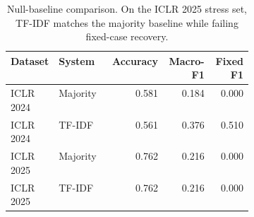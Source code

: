 \begin{table}[t]
\centering
\scriptsize
\setlength{\tabcolsep}{3pt}
\begin{tabular}{p{0.18\linewidth}p{0.22\linewidth}rrr}
\toprule
Dataset & System & Accuracy & Macro-F1 & Fixed F1 \\
\midrule
ICLR 2024 & Majority & 0.581 & 0.184 & 0.000 \\
ICLR 2024 & TF-IDF & 0.561 & 0.376 & 0.510 \\
ICLR 2025 & Majority & 0.762 & 0.216 & 0.000 \\
ICLR 2025 & TF-IDF & 0.762 & 0.216 & 0.000 \\
\bottomrule
\end{tabular}
\caption{Null-baseline comparison. On the ICLR 2025 stress set, TF-IDF matches the majority baseline while failing fixed-case recovery.}
\label{tab:null-baselines}
\end{table}
